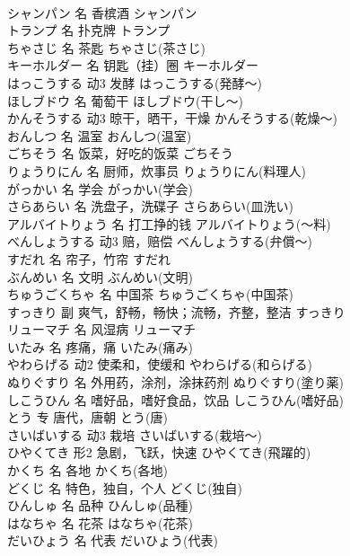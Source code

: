 \documentclass[8pt]{extreport}
\begin{document}
\begin{CJK}{UTF8}{min}
\\	シャンパン	名	香槟酒	シャンパン	
\\	トランプ	名	扑克牌	トランプ	
\\	ちゃさじ	名	茶匙	ちゃさじ(茶さじ)	
\\	キーホルダー	名	钥匙（挂）圈	キーホルダー	
\\	はっこうする	动3	发酵	はっこうする(発酵～)	
\\	ほしブドウ	名	葡萄干	ほしブドウ(干し～)	
\\	かんそうする	动3	晾干，晒干，干燥	かんそうする(乾燥～)	
\\	おんしつ	名	温室	おんしつ(温室)	
\\	ごちそう	名	饭菜，好吃的饭菜	ごちそう	
\\	りょうりにん	名	厨师，炊事员	りょうりにん(料理人)	
\\	がっかい	名	学会	がっかい(学会)	
\\	さらあらい	名	洗盘子，洗碟子	さらあらい(皿洗い)	
\\	アルバイトりょう	名	打工挣的钱	アルバイトりょう(～料)	
\\	べんしょうする	动3	赔，赔偿	べんしょうする(弁償～)	
\\	すだれ	名	帘子，竹帘	すだれ	
\\	ぶんめい	名	文明	ぶんめい(文明)	
\\	ちゅうごくちゃ	名	中国茶	ちゅうごくちゃ(中国茶)	
\\	すっきり	副	爽气，舒畅，畅快；流畅，齐整，整洁	すっきり	
\\	リューマチ	名	风湿病	リューマチ	
\\	いたみ	名	疼痛，痛	いたみ(痛み)	
\\	やわらげる	动2	使柔和，使缓和	やわらげる(和らげる)	
\\	ぬりぐすり	名	外用药，涂剂，涂抹药剂	ぬりぐすり(塗り薬)	
\\	しこうひん	名	嗜好品，嗜好食品，饮品	しこうひん(嗜好品)	
\\	とう	专	唐代，唐朝	とう(唐)	
\\	さいばいする	动3	栽培	さいばいする(栽培～)	
\\	ひやくてき	形2	急剧，飞跃，快速	ひやくてき(飛躍的)	
\\	かくち	名	各地	かくち(各地)	
\\	どくじ	名	特色，独自，个人	どくじ(独自)	
\\	ひんしゅ	名	品种	ひんしゅ(品種)	
\\	はなちゃ	名	花茶	はなちゃ(花茶)	
\\	だいひょう	名	代表	だいひょう(代表)	

\end{CJK}
\end{document}
